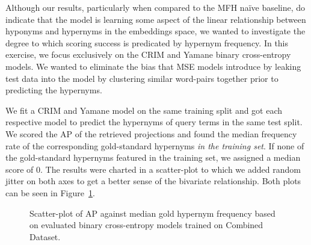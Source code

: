 Although our results, particularly when compared to the \ac{MFH} na\"ive baseline, do indicate that the model is learning some aspect of the linear relationship between hyponyms and hypernyms in the embeddings space, we wanted to investigate the degree to which scoring success is predicated by hypernym frequency.  In this exercise, we focus exclusively on the CRIM and Yamane binary cross-entropy models.  We wanted to eliminate the bias that \ac{MSE} models introduce by leaking test data into the model by clustering similar word-pairs together prior to predicting the hypernyms.

We fit a CRIM and Yamane model on the same training split and got each respective model to predict the hypernyms of query terms in the same test split.  We scored the \ac{AP} of the retrieved projections and found the median frequency rate of the corresponding gold-standard hypernyms \textit{in the training set}.  If none of the gold-standard hypernyms featured in the training set, we assigned a median score of 0. The results were charted in a scatter-plot to which we added random jitter on both axes to get a better sense of the bivariate relationship.  %
Both plots can be seen in Figure~\ref{fig:scatter_crim_yamane}.
\begin{figure}[!ht]
    \centering
    \qquad
    \caption{Scatter-plot of AP against median gold hypernym frequency based on evaluated binary cross-entropy models trained on Combined Dataset.}
    \label{fig:scatter_crim_yamane}
\end{figure}

